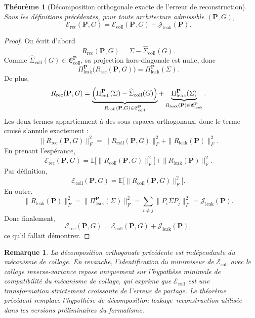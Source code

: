 \documentclass[11pt,a4paper]{article}
\newtheorem{theorem}{Théorème}[section]
\newtheorem{remark}{Remarque}[section]
\newcommand{\1}{\mathbf 1}
\begin{document}
\begin{theorem}[Décomposition orthogonale exacte de l'erreur de reconstruction]
Sous les définitions précédentes, pour toute architecture admissible \((\mathbf P,G)\),
\[
\mathcal E_{\mathrm{rec}}(\mathbf P,G)
=
\mathcal E_{\mathrm{coll}}(\mathbf P,G)
+
\mathcal J_{\mathrm{leak}}(\mathbf P).
\]
\end{theorem}

\begin{proof}
On écrit d'abord
\[
R_{\mathrm{rec}}(\mathbf P,G)
=
\Sigma-\widehat \Sigma_{\mathrm{coll}}(G).
\]
Comme \(\widehat \Sigma_{\mathrm{coll}}(G)\in \mathfrak E_{\mathrm{coll}}^{\mathbf P}\), sa projection hors-diagonale est nulle, donc
\[
\Pi_{\mathrm{leak}}^{\mathbf P}\!\bigl(R_{\mathrm{rec}}(\mathbf P,G)\bigr)
=
\Pi_{\mathrm{leak}}^{\mathbf P}(\Sigma).
\]
De plus,
\[
R_{\mathrm{rec}}(\mathbf P,G)
=
\underbrace{\Bigl(\Pi_{\mathrm{coll}}^{\mathbf P}(\Sigma)-\widehat \Sigma_{\mathrm{coll}}(G)\Bigr)}_{R_{\mathrm{coll}}(\mathbf P,G)\in\mathfrak E_{\mathrm{coll}}^{\mathbf P}}
+
\underbrace{\Pi_{\mathrm{leak}}^{\mathbf P}(\Sigma)}_{R_{\mathrm{leak}}(\mathbf P)\in\mathfrak E_{\mathrm{leak}}^{\mathbf P}}.
\]
Les deux termes appartiennent à des sous-espaces orthogonaux, donc le terme croisé s'annule exactement :
\[
\|R_{\mathrm{rec}}(\mathbf P,G)\|_F^2
=
\|R_{\mathrm{coll}}(\mathbf P,G)\|_F^2
+
\|R_{\mathrm{leak}}(\mathbf P)\|_F^2.
\]
En prenant l'espérance,
\[
\mathcal E_{\mathrm{rec}}(\mathbf P,G)
=
\mathbb E\bigl[\|R_{\mathrm{coll}}(\mathbf P,G)\|_F^2\bigr]
+
\|R_{\mathrm{leak}}(\mathbf P)\|_F^2.
\]
Par définition,
\[
\mathcal E_{\mathrm{coll}}(\mathbf P,G)
=
\mathbb E\bigl[\|R_{\mathrm{coll}}(\mathbf P,G)\|_F^2\bigr].
\]
En outre,
\[
\|R_{\mathrm{leak}}(\mathbf P)\|_F^2
=
\bigl\|\Pi_{\mathrm{leak}}^{\mathbf P}(\Sigma)\bigr\|_F^2
=
\sum_{i\neq j}\|P_i\Sigma P_j\|_F^2
=
\mathcal J_{\mathrm{leak}}(\mathbf P).
\]
Donc finalement,
\[
\mathcal E_{\mathrm{rec}}(\mathbf P,G)
=
\mathcal E_{\mathrm{coll}}(\mathbf P,G)
+
\mathcal J_{\mathrm{leak}}(\mathbf P),
\]
ce qu'il fallait démontrer.
\end{proof}

\begin{remark}
La décomposition orthogonale précédente est indépendante du mécanisme de collage.
En revanche, l'identification du minimiseur de \(\mathcal E_{\mathrm{coll}}\) avec le collage inverse-variance repose uniquement sur l'hypothèse minimale de compatibilité du mécanisme de collage, qui exprime que \(\mathcal E_{\mathrm{coll}}\) est une transformation strictement croissante de l'erreur de partage.
Le théorème précédent remplace l'hypothèse de décomposition leakage--reconstruction utilisée dans les versions préliminaires du formalisme.
\end{remark}
\end{document}
